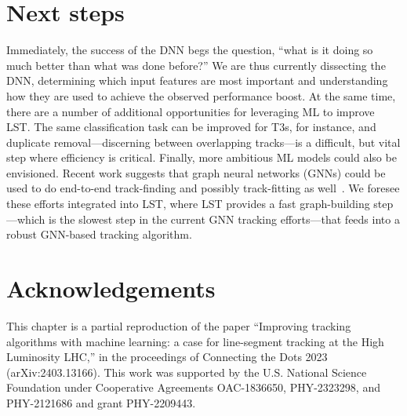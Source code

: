 \section{Next steps}
Immediately, the success of the DNN begs the question, ``what is it doing so much better than what was done before?'' 
We are thus currently dissecting the DNN, determining which input features are most important and understanding how they are used to achieve the observed performance boost. 
At the same time, there are a number of additional opportunities for leveraging ML to improve LST. 
The same classification task can be improved for T3s, for instance, and duplicate removal---discerning between overlapping tracks---is a difficult, but vital step where efficiency is critical. 
Finally, more ambitious ML models could also be envisioned. 
Recent work suggests that graph neural networks (GNNs) could be used to do end-to-end track-finding and possibly track-fitting as well~\cite{Ju2021, DeZoortNature2023, lieret2023object}. 
We foresee these efforts integrated into LST, where LST provides a fast graph-building step---which is the slowest step in the current GNN tracking efforts---that feeds into a robust GNN-based tracking algorithm.

\section{Acknowledgements}
This chapter is a partial reproduction of the paper ``Improving tracking algorithms with machine learning: a case for line-segment tracking at the High Luminosity LHC,'' in the proceedings of Connecting the Dots 2023 (arXiv:2403.13166). 
This work was supported by the U.S. National Science Foundation under Cooperative Agreements OAC-1836650, PHY-2323298, and PHY-2121686 and grant PHY-2209443.
